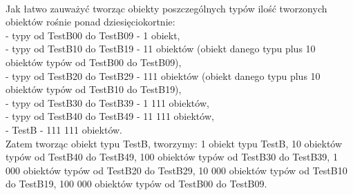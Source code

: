 \documentclass[12pt]{article}
\begin{document}
\\
Jak łatwo zauważyć tworząc obiekty poszczególnych typów ilość tworzonych obiektów rośnie ponad dziesięciokortnie:\\
- typy od TestB00 do TestB09 - 1 obiekt,\\
- typy od TestB10 do TestB19 - 11 obiektów (obiekt danego typu plus 10 obiektów typów od TestB00 do TestB09),\\
- typy od TestB20 do TestB29 - 111 obiektów (obiekt danego typu plus 10 obiektów typów od TestB10 do TestB19),\\
- typy od TestB30 do TestB39 - 1 111 obiektów,\\
- typy od TestB40 do TestB49 - 11 111 obiektów,\\
- TestB - 111 111 obiektów.\\
Zatem tworząc obiekt typu TestB, tworzymy: 1 obiekt typu TestB, 10 obiektów typów od TestB40 do TestB49, 100 obiektów typów od TestB30 do TestB39, 1 000 obiektów typów od TestB20 do TestB29, 10 000 obiektów typów od TestB10 do TestB19, 100 000 obiektów typów od TestB00 do TestB09.
\end{document}
